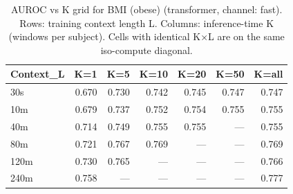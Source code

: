 \begin{table}[ht]
\centering
\caption{AUROC vs K grid for BMI (obese) (transformer, channel: fast). Rows: training context length L. Columns: inference-time K (windows per subject). Cells with identical K×L are on the same iso-compute diagonal.}
\label{tab:kgrid_bmi_binary_transformer_fast}
\begin{tabular}{lrrrrrr}
\toprule
Context_L & K=1 & K=5 & K=10 & K=20 & K=50 & K=all \\
\midrule
30s & 0.670 & 0.730 & 0.742 & 0.745 & 0.747 & 0.747 \\
10m & 0.679 & 0.737 & 0.752 & 0.754 & 0.755 & 0.755 \\
40m & 0.714 & 0.749 & 0.755 & 0.755 & — & 0.755 \\
80m & 0.721 & 0.767 & 0.769 & — & — & 0.769 \\
120m & 0.730 & 0.765 & — & — & — & 0.766 \\
240m & 0.758 & — & — & — & — & 0.777 \\
\bottomrule
\end{tabular}
\end{table}